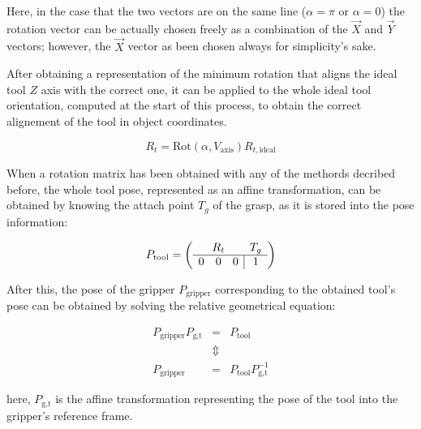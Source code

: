 Here, in the case that the two vectors are on the same line
($\alpha=\pi$ or $\alpha=0$) the rotation vector can be actually
chosen freely as a combination of the $\vec{X}$ and $\vec{Y}$ vectors;
however, the $\vec{X}$ vector as been chosen always for simplicity's sake.

After obtaining a representation of the minimum rotation  that
aligns the ideal tool $Z$ axis with the correct one, it can be applied
to the whole ideal tool orientation, computed at the start of this
process, to obtain the correct alignement of the tool in object
coordinates.

\begin{equation}
  R_t=\text{Rot}(\alpha,V_{\text{axis}}) R_{t,\text{ideal}}
\end{equation}

When a rotation matrix has been obtained with any of the methords
decribed before, the whole tool pose, represented as an affine
transformation, can be obtained by knowing the attach point $T_g$ of
the grasp, as it is stored into the pose information: 

\begin{equation}
  P_{\text{tool}}=\left( \begin{array}{ccc|c}
    \multicolumn{3}{c}{R_t} & T_g \\
    \hline 
    0 & 0 & 0 & 1
  \end{array} \right)
\end{equation}

After this, the pose of the gripper $P_{\text{gripper}}$ corresponding to the obtained
tool's pose can be obtained by solving the relative geometrical
equation:

\begin{eqnarray}
  P_{\text{gripper}} P_{\text{g,t}} &=& P_{\text{tool}} \\
  & \Updownarrow & \nonumber \\
  P_{\text{gripper}} &=& P_{\text{tool}}P_{\text{g,t}}^{-1}
\end{eqnarray}

here, $P_{\text{g,t}}$ is the affine transformation representing the
pose of the tool into the gripper's reference frame.

